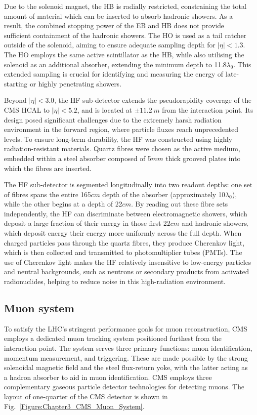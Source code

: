 Due to the solenoid magnet, the HB is radially restricted, constraining the total amount of material which can be inserted to absorb hadronic showers. As a result, the combined stopping power of the EB and HB does not provide sufficient containment of the hadronic showers. The HO is used as a tail catcher outside of the solenoid, aiming to ensure adequate sampling depth for $|\eta| < 1.3$. The HO employs the same active scintillator as the HB, while also utilising the solenoid as an additional absorber, extending the minimum depth to 11.8$\lambda_0$. This extended sampling is crucial for identifying and measuring the energy of late-starting or highly penetrating showers.

Beyond $|\eta| < 3.0$, the HF sub-detector extends the pseudorapidity coverage of the CMS HCAL to $|\eta| < 5.2$, and is located at $\pm 11.2~\unit{m}$ from the interaction point. Its design posed significant challenges due to the extremely harsh radiation environment in the forward region, where particle fluxes reach unprecedented levels. To ensure long-term durability, the HF was constructed using highly radiation-resistant materials. Quartz fibres were chosen as the active medium, embedded within a steel absorber composed of 5$\unit{mm}$ thick grooved plates into which the fibres are inserted. 

The HF sub-detector is segmented longitudinally into two readout depths: one set of fibres spans the entire 165$\unit{cm}$ depth of the absorber (approximately 10$\lambda_0$), while the other begins at a depth of 22$\unit{cm}$. By reading out these fibre sets independently, the HF can discriminate between electromagnetic showers, which deposit a large fraction of their energy in those first $22\unit{cm}$ and hadronic showers, which deposit energy their energy more uniformly across the full depth. When charged particles pass through the quartz fibres, they produce Cherenkov light, which is then collected and transmitted to photomultiplier tubes (PMTs). The use of Cherenkov light makes the HF relatively insensitive to low-energy particles and neutral backgrounds, such as neutrons or secondary products from activated radionuclides, helping to reduce noise in this high-radiation environment.

\subsection{Muon system}
To satisfy the LHC’s stringent performance goals for muon reconstruction, CMS employs a dedicated muon tracking system positioned furthest from the interaction point. The system serves three primary functions: muon identification, momentum measurement, and triggering. These are made possible by the strong solenoidal magnetic field and the steel flux-return yoke, with the latter acting as a hadron absorber to aid in muon identification.  CMS employs three complementary gaseous particle detector technologies for detecting muons. The layout of one-quarter of the CMS detector is shown in Fig.~\ref{Figure:Chapter3_CMS_Muon_System}. 

